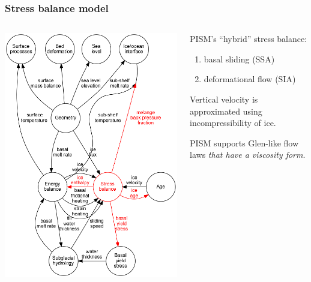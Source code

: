 \documentclass[hide notes,intlimits]{beamer}
\begin{document}
\begin{frame}
  \frametitle{Stress balance model}

  \begin{columns}
    \begin{column}{0.45\linewidth}
      \includegraphics[width=\linewidth]{update-3-stress}
    \end{column}
    \begin{column}{0.5\linewidth}
      PISM's ``hybrid'' stress balance:
      \begin{enumerate}
      \item basal sliding (SSA)
      \item deformational flow (SIA)
      \end{enumerate}

      \medskip
      Vertical velocity is approximated using incompressibility of ice.

      \medskip
      PISM supports Glen-like flow laws \emph{that have a viscosity form}.
    \end{column}
  \end{columns}
\end{frame}
\end{document}
